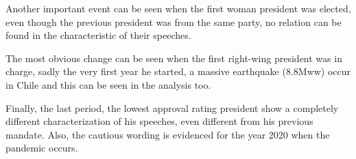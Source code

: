 \documentclass[
  12pt,
]{article}
\begin{document}
Another important event can be seen when the first woman president was elected, even though the previous president was from the same party, no relation can be found in the characteristic of their speeches.

The most obvious change can be seen when the first right-wing president was in charge, sadly the very first year he started, a massive earthquake (8.8Mww) occur in Chile and this can be seen in the analysis too.

Finally, the last period, the lowest approval rating president show a completely different characterization of his speeches, even different from his previous mandate. Also, the cautious wording is evidenced for the year 2020 when the pandemic occurs.
\end{document}
